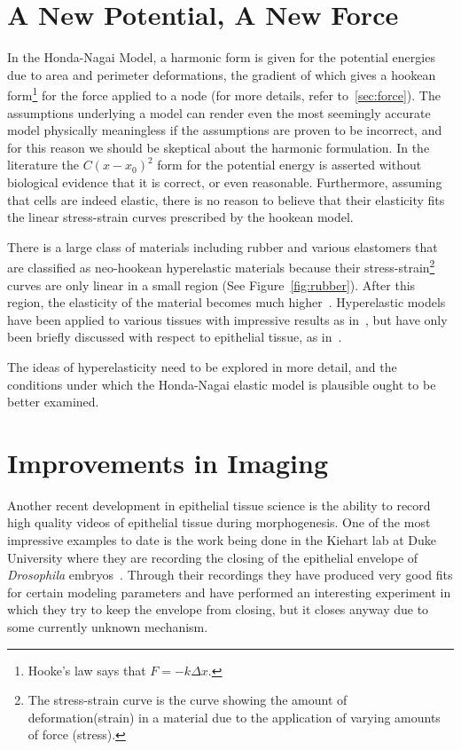 \section{A New Potential, A New Force}
In the Honda-Nagai Model, a harmonic form is given for the potential energies due to area and perimeter deformations, the gradient of which gives a hookean form\footnote{Hooke's law says that $F=-k\Delta x$.} for the force applied to a node (for more details, refer to~\ref{sec:force}). The assumptions underlying a model can render even the most seemingly accurate model physically meaningless if the assumptions are proven to be incorrect, and for this reason we should be skeptical about the harmonic formulation. In the literature the $C(x-x_0)^2$ form for the potential energy is asserted without biological evidence that it is correct, or even reasonable. Furthermore, assuming that cells are indeed elastic, there is no reason to believe that their elasticity fits the linear stress-strain curves prescribed by the hookean model.

There is a large class of materials including rubber and various elastomers that are classified as neo-hookean hyperelastic materials because their stress-strain\footnote{The stress-strain curve is the curve showing the amount of deformation(strain) in a material due to the application of varying amounts of force (stress).} curves are only linear in a small region (See Figure~\ref{fig:rubber}). After this region, the elasticity of the material becomes much higher~\cite{Rubber, Rubber2}. Hyperelastic models have been applied to various tissues with impressive results as in~\cite{hyperbio, hyperbio2}, but have only been briefly discussed with respect to epithelial tissue, as in~\cite{epihyper, epihyper2}.

The ideas of hyperelasticity need to be explored in more detail, and the conditions under which the Honda-Nagai elastic model is plausible ought to be better examined.

\section{Improvements in Imaging}
Another recent development in epithelial tissue science is the ability to record high quality videos of epithelial tissue during morphogenesis. One of the most impressive examples to date is the work being done in the Kiehart lab at Duke University where they are recording the closing of the epithelial envelope of \emph{Drosophila} embryos~\cite{Sokolow}. Through their recordings they have produced very good fits for certain modeling parameters and have performed an interesting experiment in which they try to keep the envelope from closing, but it closes anyway due to some currently unknown mechanism. 

